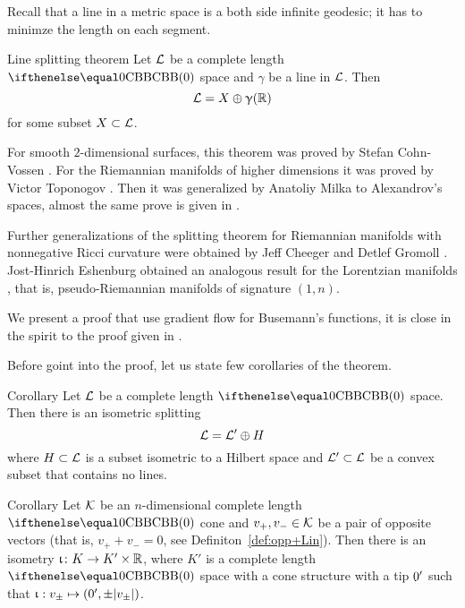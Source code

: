 Recall that a line in a metric space is a both side infinite geodesic; it has to minimze the length on each segment.

 {\sloppy 

\begin{thm}{Line splitting theorem}\label{thm:splitting}
Let $\mathcal{L}$  be a complete length $\Alex{0}$ space
and $\gamma$ be a line in $\mathcal{L}$. 
Then 
\[\mathcal{L}=X\oplus \upgamma(\mathbb{R})\]
for some subset $X\subset \spc{L}$.
\end{thm}

}

For smooth $2$-dimensional surfaces, 
this theorem was proved by Stefan Cohn-Vossen \cite{cohn-vossen_line}.
For the Riemannian manifolds of higher dimensions 
it was proved by Victor Toponogov \cite{toponogov-globalization+splitting}.
Then it was generalized by Anatoliy Milka \cite{milka-line}
to Alexandrov's spaces, almost the same prove is given in \cite[1.5]{burago-burago-ivanov}.

Further generalizations of the splitting theorem for Riemannian manifolds with nonnegative Ricci curvature were obtained by Jeff Cheeger and Detlef Gromoll \cite{cheeger-gromoll-split}.
Jost-Hinrich Eshenburg obtained an analogous result for the Lorentzian manifolds \cite{eshenburg-split}, that is, pseudo-Riemannian manifolds of signature $(1,n)$.

We present a proof that use gradient flow for Busemann's functions, it is close in the spirit to the proof given in \cite{cheeger-gromoll-split}.

Before goint into the proof, let us state few corollaries of the theorem.

\begin{thm}{Corollary}\label{cor:splitting}
Let $\mathcal{L}$ be a complete length $\Alex{0}$ space. 
Then there is an isometric splitting
\[
\mathcal{L}=\mathcal{L}'\oplus H
\]
where $H\subset \spc{L}$ is a subset isometric to a Hilbert space and $\spc{L}'\subset \spc{L}$ be a convex subset that contains no lines. 
\end{thm}

 {\sloppy 

\begin{thm}{Corollary}\label{cor:splitting-vectors}
Let $\mathcal{K}$ be an $n$-dimensional complete length $\Alex0$ cone and $v_+,v_-\in \spc{K}$ be a pair of opposite vectors 
(that is, $v_+ + v_-=0$, see Definiton~\ref{def:opp+Lin}).
Then there is an isometry $\iota\:K\to K'\times \RR$, where $K'$ is a complete length $\Alex0$ space with a cone structure with a tip $0'$ such that
$\iota:v_\pm\mapsto (\0',\pm|v_\pm|)$.
\end{thm}

}

